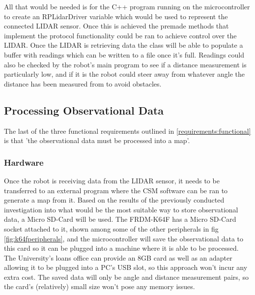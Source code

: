 				All that would be needed is for the C++ program running on the microcontroller to create an RPLidarDriver variable which would be used to represent the connected LIDAR sensor. Once this is achieved the premade methods that implement the protocol functionality could be ran to achieve control over the LIDAR. Once the LIDAR is retrieving data the class will be able to populate a buffer with readings which can be written to a file once it's full. Readings could also be checked by the robot's main program to see if a distance measurement is particularly low, and if it is the robot could steer away from whatever angle the distance has been measured from to avoid obstacles.
				
			\subsection{Processing Observational Data}
			\label{section:processing:intro}
			The last of the three functional requirements outlined in \ref{requirements:functional} is that 'the observational data must be processed into a map'.
				\subsubsection{Hardware}
				Once the robot is receiving data from the LIDAR sensor, it needs to be transferred to an external program where the CSM software can be ran to generate a map from it. Based on the results of the previously conducted investigation into what would be the most suitable way to store observational data, a Micro SD-Card will be used. The FRDM-K64F has a Micro SD-Card socket attached to it, shown among some of the other peripherals in fig \ref{fig:k64fperipherals}, and the microcontroller will save the observational data to this card so it can be plugged into a machine where it is able to be processed. The University's loans office can provide an 8GB card as well as an adapter allowing it to be plugged into a PC's USB slot, so this approach won't incur any extra cost. The saved data will only be angle and distance measurement pairs, so the card's (relatively) small size won't pose any memory issues. 
				
